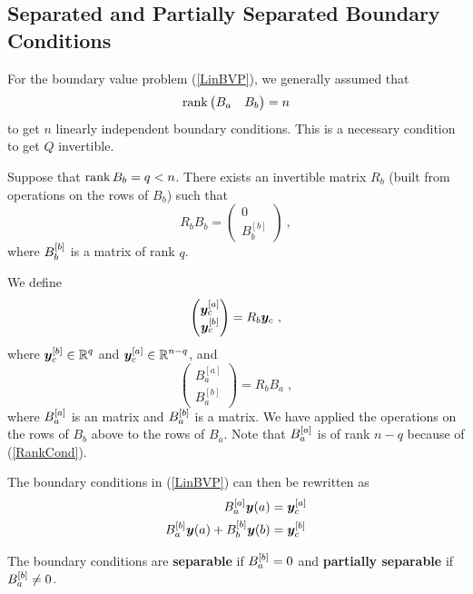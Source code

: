 \subsection{Separated and Partially Separated Boundary Conditions}
\label{SepPartSep}
  
For the boundary value problem (\ref{LinBVP}), we generally assumed that
\begin{equation} \label{RankCond}
\operatorname{rank} \begin{pmatrix} B_a & B_b \end{pmatrix} = n
\end{equation}
to get $n$ linearly independent boundary conditions.   This is a
necessary condition to get $Q$ invertible.

Suppose that $\operatorname{rank} B_b = q < n$.   There exists an \nn invertible
matrix $R_b$ (built from operations on the rows of $B_b$) such that
\[
R_b B_b = \begin{pmatrix} 0 \\ B_b^{[b]} \end{pmatrix} \ ,
\]
where $\displaystyle B_b^{[b]}$ is a  matrix of rank $q$.

We define
\[
\begin{pmatrix} \bm{y}_{c}^{[a]} \\ \bm{y}_{c}^{[b]} \end{pmatrix} = R_b
\bm{y}_c \ ,
\]
where $\displaystyle \bm{y}_{c}^{[b]} \in \mathbb{R}^q$ and
$\displaystyle \bm{y}_{c}^{[a]} \in \mathbb{R}^{n-q}$, and
\[
\begin{pmatrix} B_a^{[a]} \\ B_a^{[b]} \end{pmatrix} = R_b B_a \; ,
\]
where $\displaystyle B_a^{[a]}$ is an  matrix and
$\displaystyle B_a^{[b]}$ is a  matrix.  We have applied the
operations on the rows of $B_b$ above to the rows of $B_a$.   Note
that $\displaystyle B_a^{[a]}$ is of rank $n-q$ because of (\ref{RankCond}).

The boundary conditions in (\ref{LinBVP}) can then be rewritten as 
\begin{equation}\label{LinBVPpartSep}
\begin{split}
B_a^{[a]} \bm{y}(a) &= \bm{y}_{c}^{[a]} \\
B_a^{[b]} \bm{y}(a) + B_b^{[b]} \bm{y}(b) &= \bm{y}_{c}^{[b]}
\end{split}
\end{equation}

The boundary conditions are
{\bfseries separable} if
$\displaystyle B_a^{[b]} = 0$ and
{\bfseries partially separable} if $\displaystyle B_a^{[b]} \neq 0$.

